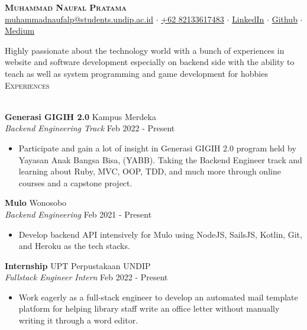 \documentclass[a4paper]{article}
\newcommand{\lineunder} {
    \vspace*{-8pt} \\
    \hspace*{-18pt} \hrulefill \\
}
\newcommand{\header} [1] {
    {\hspace*{-18pt}\vspace*{6pt} \textsc{#1}}
    \vspace*{-6pt} \lineunder
}
\begin{document}
\vspace*{-40pt}

\vspace*{-10pt}
\begin{center}
	{\Huge \scshape \textbf{Muhammad Naufal Pratama}}\\
	\href{mailto:muhammadnaufalp@students.undip.ac.id}{muhammadnaufalp@students.undip.ac.id} $\cdot$ \href{wa.me/6282133617483}{+62 82133617483} $\cdot$ \href{https://linkedin.com/in/mnpratamaa}{LinkedIn} $\cdot$ \href{https://github.com/mhnaufal}{Github} $\cdot$ \href{mprtmma.medium.com}{Medium}\\
\end{center}

Highly passionate about the technology world with a bunch of experiences in website and software development especially on backend side with the ability to teach as well as system programming and game development for hobbies\\

\header{Experiences}
\vspace{1mm}

\textbf{Generasi GIGIH 2.0} \hfill Kampus Merdeka \\
\textit{Backend Engineering Track} \hfill Feb 2022 - Present\\
\vspace{-1mm}
\begin{itemize} \itemsep 1pt
	\item Participate and gain a lot of insight in Generasi GIGIH 2.0 program held by Yayasan Anak Bangsa Bisa, (YABB). Taking the Backend Engineer track and learning about Ruby, MVC, OOP, TDD, and much more through online courses and a capstone project.
\end{itemize}

\textbf{Mulo} \hfill Wonosobo \\
\textit{Backend Engineering} \hfill Feb 2021 - Present\\
\vspace{-1mm}
\begin{itemize} \itemsep 1pt
	\item Develop backend API intensively for Mulo using NodeJS, SailsJS, Kotlin, Git, and Heroku as the tech stacks.
\end{itemize}

\textbf{Internship} \hfill UPT Perpustakaan UNDIP \\
\textit{Fullstack Engineer Intern} \hfill Feb 2022 - Present\\
\vspace{-1mm}
\begin{itemize} \itemsep 1pt
	\item Work eagerly as a full-stack engineer to develop an automated mail template platform for helping library staff write an office letter without manually writing it through a word editor.
\end{itemize}
\end{document}
